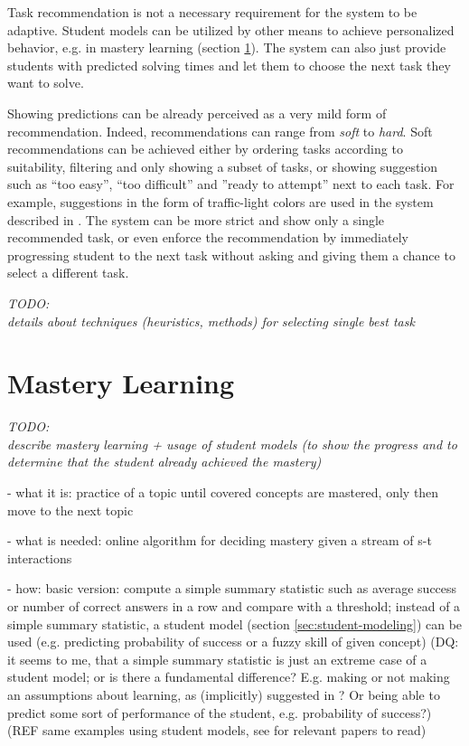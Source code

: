 Task recommendation is not a necessary requirement
  for the system to be adaptive.
Student models can be utilized by other means to achieve personalized behavior,
  e.g. in mastery learning (section \ref{sec:mastery-learning}).
The system can also just provide students with predicted solving times
  and let them to choose the next task they want to solve.

Showing predictions can be already perceived as a very mild form of recommendation.
Indeed, recommendations can range from \emph{soft} to \emph{hard}.
Soft recommendations can be achieved either by
  ordering tasks according to suitability,
  filtering and only showing a subset of tasks,
  or showing suggestion such as
  ``too easy'', ``too difficult'' and ''ready to attempt'' next to each task.
For example, suggestions in the form of traffic-light colors
  are used in the system described in \cite{its-programming}.
The system can be more strict and show only a single recommended task,
  or even enforce the recommendation by immediately progressing student to
  the next task without asking and giving them a chance to select a different task.

\bigskip
\emph{TODO:\\details about techniques (heuristics, methods) for selecting single best task}


\section{Mastery Learning}
\label{sec:mastery-learning}

\emph{TODO:\\describe mastery learning + usage of student models%
(to show the progress and to determine that the student already achieved the mastery)}

- what it is: practice of a topic until covered concepts are mastered, only then move to the next topic

- what is needed: online algorithm for deciding mastery given a stream of s-t interactions

- how: basic version: compute a simple summary statistic such as average
success or number of correct answers in a row and compare with a threshold;
instead of a simple summary statistic, a student model (section
\ref{sec:student-modeling}) can be used (e.g. predicting probability of success
or a fuzzy skill of given concept)
(DQ: it seems to me, that a simple summary statistic is just an extreme case of
a student model; or is there a fundamental difference? E.g. making or not
making an assumptions about learning, as (implicitly) suggested in \cite{alg.mastery}?
Or being able to predict some sort of performance of the student, e.g. probability of
success?)
(REF same examples using student models, see \cite{alg.mastery} for relevant
papers to read)

